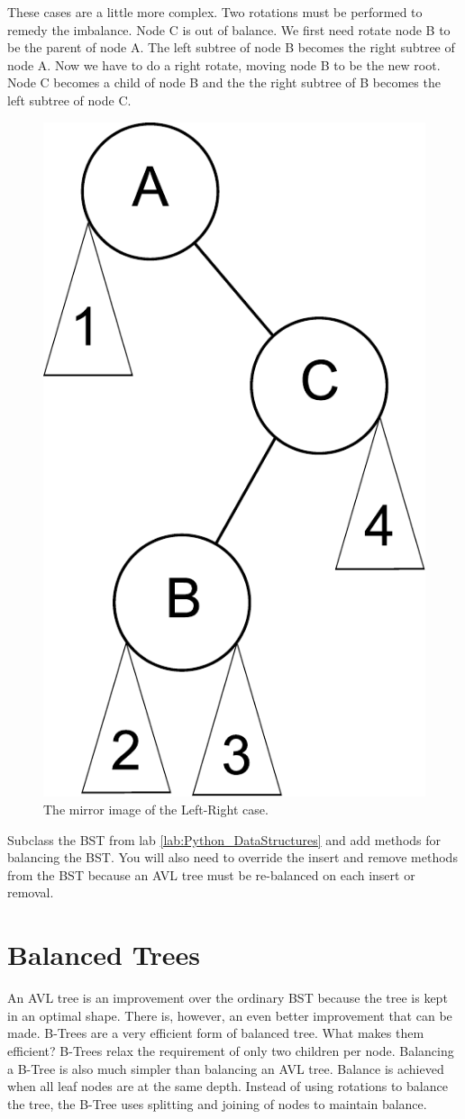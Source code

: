 These cases are a little more complex.
Two rotations must be performed to remedy the imbalance.
Node C is out of balance.
We first need rotate node B to be the parent of node A.
The left subtree of node B becomes the right subtree of node A.
Now we have to do a right rotate, moving node B to be the new root.
Node C becomes a child of node B and the the right subtree of B becomes the left subtree of node C.

\begin{figure}[h]
\centering
\includegraphics[width=.33\textwidth]{right_left.pdf}
\caption{The mirror image of the Left-Right case.}
\end{figure}

\begin{problem}
Subclass the BST from lab \ref{lab:Python_DataStructures} and add methods for balancing the BST.
You will also need to override the insert and remove methods from the BST because an AVL tree must be re-balanced on each insert or removal.
\end{problem}

\section*{Balanced Trees}
An AVL tree is an improvement over the ordinary BST because the tree is kept in an optimal shape.
There is, however, an even better improvement that can be made.
B-Trees are a very efficient form of balanced tree.
What makes them efficient?  B-Trees relax the requirement of only two children per node.
Balancing a B-Tree is also much simpler than balancing an AVL tree.
Balance is achieved when all leaf nodes are at the same depth.
Instead of using rotations to balance the tree, the B-Tree uses splitting and joining of nodes to maintain balance.

